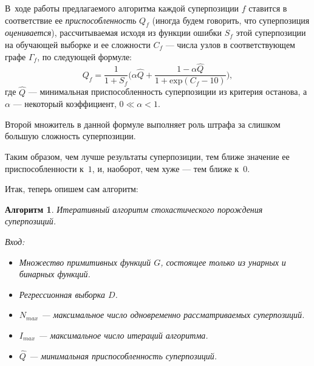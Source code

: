 \documentclass[12pt,a4paper]{amsart}
\newtheorem{algo}{Алгоритм}
\begin{document}
В~ходе работы предлагаемого алгоритма каждой суперпозиции $f$ ставится в
соответствие ее \emph{приспособленность} $Q_f$ (иногда будем говорить, что
суперпозиция \emph{оценивается}), рассчитываемая исходя из функции ошибки
$S_f$ этой суперпозиции на обучающей выборке и ее сложности $C_f$ ---
числа узлов в соответствующем графе $\Gamma_f$, по следующей формуле:
\begin{equation}
  \label{eq:q_f}
  Q_f = \frac{1}{1 + S_f} \big(\alpha \hat{Q} + \frac{1 - \alpha \hat{Q}}{1 + \text{exp} (C_f - 10)}\big),
\end{equation}
где $\hat{Q}$ --- минимальная приспособленность суперпозиции из критерия
останова, а $\alpha$ --- некоторый коэффициент, $0 \ll \alpha < 1$.

Второй множитель в данной формуле выполняет роль штрафа за слишком
большую сложность суперпозиции.

Таким образом, чем лучше результаты суперпозиции, тем ближе значение ее
приспособленности к~$1$, и, наоборот, чем хуже --- тем ближе к~$0$.

Итак, теперь опишем сам алгоритм:
\begin{algo}
  Итеративный алгоритм стохастического порождения суперпозиций.

  Вход:
  \begin{itemize}
	\item Множество примитивных функций $G$, состоящее только из унарных
	  и бинарных функций.
	\item Регрессионная выборка $D$.
	\item $N_{max}$ --- максимальное число одновременно рассматриваемых
	  суперпозиций.
	\item $I_{max}$ --- максимальное число итераций алгоритма.
	\item $\hat{Q}$ --- минимальная приспособленность суперпозиций.
  \end{itemize}
\end{algo}
\end{document}

